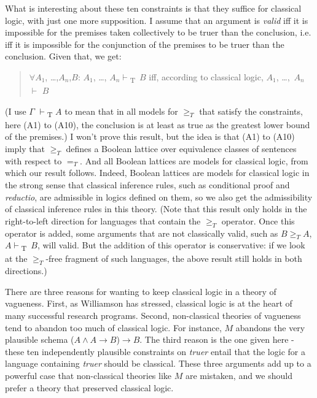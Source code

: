 What is interesting about these ten constraints is that they suffice for
classical logic, with just one more supposition. I assume that an
argument is \emph{valid} iff it is impossible for the premises taken
collectively to be truer than the conclusion, i.e. iff it is impossible
for the conjunction of the premises to be truer than the conclusion.
Given that, we get:

\begin{quote}
\(\forall A_1\), {\ldots{}},\(A_n\),\(B\): \(A_1\), {\ldots{}},
\(A_n \vdash\)\textsubscript{T}~\(B\) iff, according to classical logic,
\(A_1\), {\ldots{}},~\(A_n\) \(\vdash\) \(B\)
\end{quote}

(I use \(\Gamma\) \(\vdash\)\textsubscript{T} \(A\) to mean that in all
models for \(\geqslant _T\) that satisfy the constraints, here (A1) to
(A10), the conclusion is at least as true as the greatest lower bound of
the premises.) I won't prove this result, but the idea is that (A1) to
(A10) imply that \(\geqslant _T\) defines a Boolean lattice over
equivalence classes of sentences with respect to \(=_T\). And all
Boolean lattices are models for classical logic, from which our result
follows. Indeed, Boolean lattices are models for classical logic in the
strong sense that classical inference rules, such as conditional proof
and \emph{reductio}, are admissible in logics defined on them, so we
also get the admissibility of classical inference rules in this theory.
(Note that this result only holds in the right-to-left direction for
languages that contain the \(\geqslant _T\) operator. Once this operator
is added, some arguments that are not classically valid, such as
\(B \geqslant _T A\), \(A \vdash\)\textsubscript{T}~\(B\), will valid.
But the addition of this operator is conservative: if we look at the
\(\geqslant _T\)-free fragment of such languages, the above result still
holds in both directions.)

There are three reasons for wanting to keep classical logic in a theory
of vagueness. First, as Williamson has stressed, classical logic is at
the heart of many successful research programs. Second, non-classical
theories of vagueness tend to abandon too much of classical logic. For
instance, \(M\) abandons the very plausible schema
(\(A \wedge A \rightarrow B\))\(\rightarrow B\). The third reason is the
one given here - these ten independently plausible constraints on
\emph{truer} entail that the logic for a language containing
\emph{truer} should be classical. These three arguments add up to a
powerful case that non-classical theories like \(M\) are mistaken, and
we should prefer a theory that preserved classical logic.


